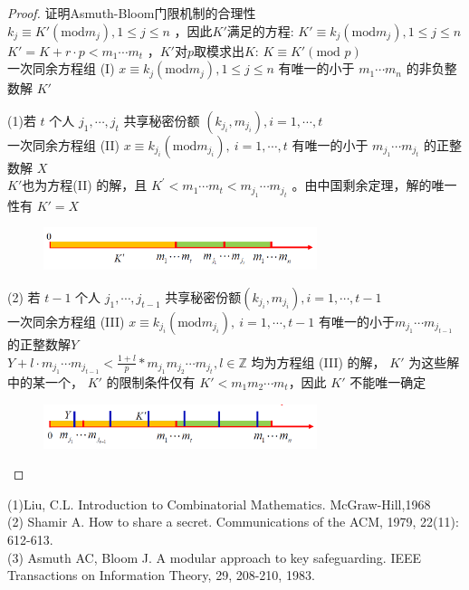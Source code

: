 \documentclass[10t, a4paper, oneside]{ctexbook}
\begin{document}
\begin{proof}{证明Asmuth-Bloom门限机制的合理性}\\
    $k_j\equiv K'({\mathrm{mod}}m_j),1\leq j\leq n$ ，因此$K'$满足的方程: $K'\equiv k_j({\mathrm{mod}}m_j),1\leq j\leq n$\\
    $K'=K+r\cdot p<m_1\cdots m_t$ ，$K'$对$p$取模求出$K$: $K\equiv K'(\text{mod }p)$\\
    一次同余方程组 (I) $x\equiv k_j\left({\mathrm{mod}}m_j\right),1\leq j\leq n$ 有唯一的小于 $m_1\cdots m_n$ 的非负整数解 $K'$\par
    (1)若 $t$ 个人 $j_1,\cdots,j_t$ 共享秘密份额 $\left(k_{j_i},m_{j_i}\right),i=1,\cdots,t$\\
    一次同余方程组 (II) $x\equiv k_{j_i}({\mathrm{mod}}m_{j_i}),\:i=1,\cdots,t$ 有唯一的小于 $m_{j_1}\cdots m_{j_t}$ 的正整数解 $X$\\
    $K'$也为方程(II) 的解，且 $K^{\prime}<m_1\cdots m_t<m_{j_1}\cdots m_{j_t}$ 。由中国剩余定理，解的唯一性有 $K'= X$ 
    \begin{figure}[H]
        \centering
        \includegraphics[width=8cm]{assets/方程ⅡK'值所在区间.png}
    \end{figure}
    (2) 若 $t-1$ 个人 $j_1,\cdots,j_{t-1}$ 共享秘密份额$\left(k_{j_i},m_{j_i}\right),i=1,\cdots,t-1$\\
    一次同余方程组 (III) $x\equiv k_{j_i}({\mathrm{mod}}m_{j_i}),\:i=1,\cdots,t-1$ 有唯一的小于$m_{j_1}\cdots m_{j_{t-1}}$的正整数解$Y$\\
    $Y+l\cdot m_{j_1}\cdots m_{j_{t-1}} < \frac{1+l}{p}*m_{j_1}m_{j_2}\cdots m_{j_{t}},l\in\mathbb{Z}$ 均为方程组 (III) 的解，  $K'$ 为这些解中的某一个， $K'$ 的限制条件仅有 $K' < m_1 m_2\cdots m_t$，因此 $K'$ 不能唯一确定 
    \begin{figure}[H]
        \centering
        \includegraphics[width=8cm]{assets/方程ⅢK'值所在区间.png}
    \end{figure}
\end{proof}

\noindent(1)Liu, C.L. Introduction to Combinatorial Mathematics. McGraw-Hill,1968\\
(2) Shamir A. How to share a secret. Communications of the ACM, 1979, 22(11): 612-613.\\
(3) Asmuth AC, Bloom J. A modular approach to key safeguarding. IEEE Transactions on Information Theory, 29, 208-210, 1983.\\
\end{document}
